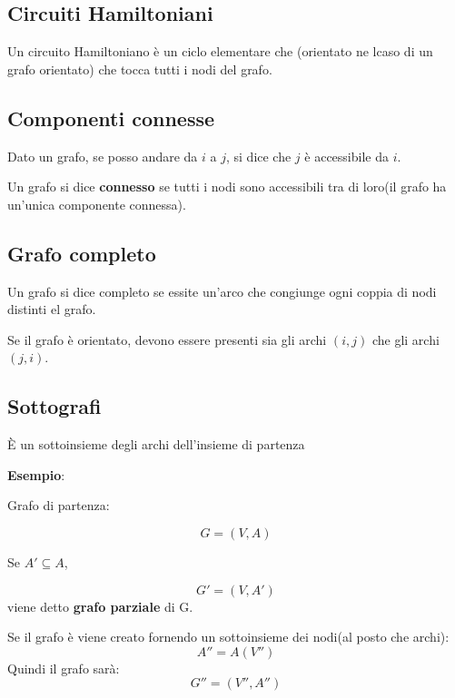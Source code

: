 \subsection{Circuiti Hamiltoniani}

Un circuito Hamiltoniano è un ciclo elementare che (orientato ne lcaso di un grafo orientato) che 
tocca tutti i nodi del grafo.

\subsection{Componenti connesse}
Dato un grafo, se posso andare da $i$ a $j$, si dice che $j$ è accessibile da $i$.

Un grafo si dice \textbf{connesso} se tutti i nodi sono accessibili tra di loro(il grafo ha un'unica componente connessa).

\subsection{Grafo completo}
Un grafo si dice completo se essite un'arco che congiunge 
ogni coppia di nodi distinti el grafo.

Se il grafo è orientato, devono essere presenti sia gli archi $(i, j)$ che gli archi $(j, i)$.

\subsection{Sottografi}
È un sottoinsieme degli archi dell'insieme di partenza

\textbf{Esempio}:


Grafo di partenza:

\begin{equation*}
    G = (V, A)
\end{equation*}

Se $A' \subseteq A$, 

\begin{equation*}
    G' = (V, A')
\end{equation*}
viene detto \textbf{grafo parziale} di G.

Se il grafo è viene creato fornendo un sottoinsieme dei nodi(al posto che archi):
\begin{equation*}
    A'' = A(V'')
\end{equation*}
Quindi il grafo sarà:
\begin{equation*}
    G'' = (V'', A'')
\end{equation*}

